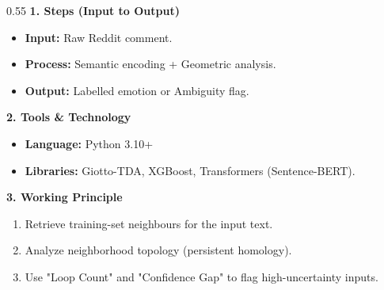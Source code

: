 \begin{columns}[T]
    \begin{column}{0.55\textwidth}
        \small
        \textbf{1. Steps (Input to Output)}
        \begin{itemize}
            \item \textbf{Input:} Raw Reddit comment.
            \item \textbf{Process:} Semantic encoding + Geometric analysis.
            \item \textbf{Output:} Labelled emotion or Ambiguity flag.
        \end{itemize}

        \vspace{0.2cm}
        \textbf{2. Tools \& Technology}
        \begin{itemize}
            \item \textbf{Language:} Python 3.10+
            \item \textbf{Libraries:} Giotto-TDA, XGBoost, Transformers (Sentence-BERT).
        \end{itemize}

        \vspace{0.2cm}
        \textbf{3. Working Principle}
        \begin{enumerate}
            \item Retrieve training-set neighbours for the input text.
            \item Analyze neighborhood topology (persistent homology).
            \item Use "Loop Count" and "Confidence Gap" to flag high-uncertainty inputs.
        \end{enumerate}
    \end{column}
\end{columns}
